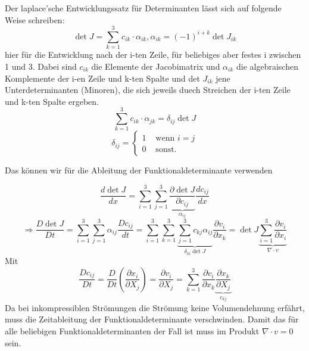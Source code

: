 \documentclass[
	11pt, %
]{beamer}
\begin{document}
\begin{frame}
	Der laplace'sche Entwicklungssatz f\"ur Determinanten l\"asst sich auf folgende Weise schreiben:
	\begin{equation}
		\operatorname{det}J = \sum_{k=1}^3 c_{ik}\cdot \alpha_{ik}, \alpha_{ik}=(-1)^{i+k} \operatorname{det}J_{ik}
	\end{equation}
	hier f\"ur die Entwicklung nach der i-ten Zeile, f\"ur beliebiges aber festes i zwischen 1 und 3. Dabei sind $c_{ik}$ die Elemente der Jacobimatrix und $\alpha_{ik}$ die algebraischen Komplemente der i-en Zeile und k-ten Spalte und det $J_{ik}$ jene Unterdeterminanten (Minoren), die sich jeweils duech Streichen der i-ten Zeile und k-ten Spalte ergeben.
	\begin{equation}
		\sum_{k=1}^3 c_{ik}\cdot \alpha_{jk}=\delta_{ij}\operatorname{det}J
	\end{equation}
		$$
		\delta_{ij}=\left\{\begin{array}{cl}
			1 & \text { wenn }i = j \\
			0 & \text { sonst. }
		\end{array}\right.
		$$

	Das k\"onnen wir f\"ur die Ableitung der Funktionaldeterminante verwenden
\end{frame}
\begin{frame}
	\begin{equation}
		\frac{d\operatorname{det}J}{dx}=\sum_{i=1}^3\sum_{j=1}^3\underbrace{\frac{\partial\operatorname{det}J}{\partial c_{ij}}}_{\alpha_{ij}}\frac{dc_{ij}}{dx}
	\end{equation}
	\begin{equation}
		\Rightarrow \frac{D\operatorname{det}J}{Dt}=\sum_{i=1}^3\sum_{j=1}^3\alpha_{ij}\frac{Dc_{ij}}{dt}=\sum_{i=1}^3\sum_{k=1}^3\underbrace{\sum_{j=1}^3c_{kj}\alpha_{ij}}_{\delta_{ki}\operatorname{det} J}\frac{\partial v_i}{\partial x_k}=\operatorname{det} J\underbrace{\sum_{i=1}^3\frac{\partial v_i}{\partial x_i}}_{\nabla\cdot v}
	\end{equation}
	Mit
	\begin{equation}
		\frac{Dc_{ij}}{Dt}=\frac{D}{Dt}\left(\frac{\partial x_i}{\partial X_j}\right)=\frac{\partial v_i}{\partial X_j}=\sum_{k=1}^3\frac{\partial v_i}{\partial x_k}\underbrace{\frac{\partial x_k}{\partial X_j}}_{c_{kj}}
	\end{equation}
	Da bei inkompressiblen Str\"omungen die Str\"omung keine Volumendehnung erf\"ahrt, muss die Zeitableitung der Funktionaldeterminante verschwinden. Damit das f\"ur alle beliebigen Funktionaldeterminanten der Fall ist muss im Produkt $\nabla\cdot v=0$ sein. 
\end{frame}
\end{document}
